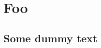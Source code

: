\documentclass{report}
\begin{document}
\chapter[\chapterprefix=false]{Foo}
\thispagestyle{empty}

\lipsum[1]

\pagebreak

\thispagestyle{fancy}

\section{Some dummy text}
\lipsum[1-18]
\end{document}
